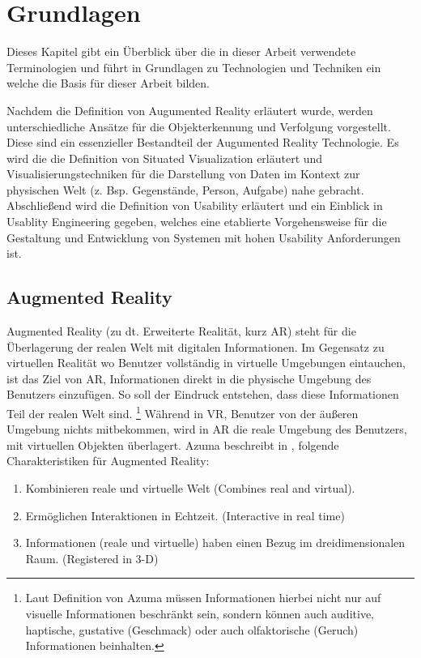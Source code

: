 \chapter{Grundlagen} \label{CapterFundamentals}

Dieses Kapitel gibt ein Überblick über die in dieser Arbeit verwendete Terminologien und führt in Grundlagen zu Technologien und Techniken ein welche die Basis für dieser Arbeit bilden. 

Nachdem die Definition von Augumented Reality erläutert wurde, werden unterschiedliche Ansätze für die Objekterkennung und Verfolgung vorgestellt.  
Diese sind ein essenzieller Bestandteil der Augumented Reality Technologie. Es wird die die Definition von Situated Visualization erläutert und Visualisierungstechniken für die Darstellung von Daten im Kontext zur physischen Welt (z. Bsp. Gegenstände, Person, Aufgabe) nahe gebracht. Abschließend wird die Definition von Usability erläutert und ein Einblick in Usablity Engineering gegeben, welches eine etablierte Vorgehensweise für die Gestaltung und Entwicklung von Systemen mit hohen Usability Anforderungen ist. 

\section{Augmented Reality}

Augmented Reality (zu dt. Erweiterte Realität, kurz AR) steht für die Überlagerung der realen Welt mit digitalen Informationen. \cite{Azuma.1997,DieterSchmalstieg2016} Im Gegensatz zu virtuellen Realität wo Benutzer vollständig in virtuelle Umgebungen eintauchen,
ist das Ziel von AR, Informationen direkt in die physische Umgebung des Benutzers einzufügen. So soll der Eindruck entstehen, dass diese Informationen Teil der realen Welt sind. \footnote{ Laut Definition von Azuma  müssen Informationen hierbei nicht nur auf visuelle Informationen beschränkt sein, 
sondern können auch auditive, haptische, gustative (Geschmack) oder auch olfaktorische (Geruch) Informationen beinhalten.} \cite{Azuma.1997} Während in VR, Benutzer von der äußeren Umgebung nichts mitbekommen, wird in AR die reale Umgebung des Benutzers, mit virtuellen 
Objekten überlagert. Azuma beschreibt in \cite{Azuma.1997}, folgende Charakteristiken für Augmented Reality: 

\begin{enumerate}
	\item Kombinieren reale und virtuelle Welt (Combines real and virtual).
	\item Ermöglichen Interaktionen in Echtzeit. (Interactive in real time)
	\item Informationen (reale und virtuelle) haben einen Bezug im dreidimensionalen Raum. (Registered in 3-D)
\end{enumerate}

